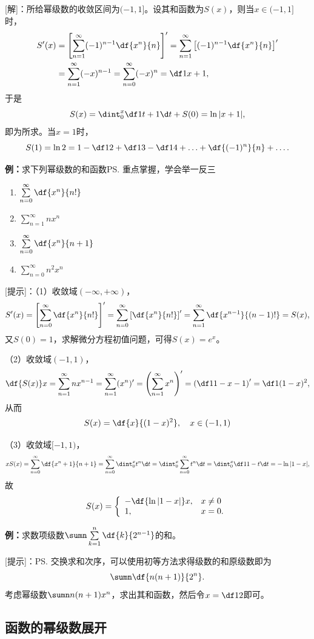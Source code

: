 [解]：所给幂级数的收敛区间为$(-1,1]$。设其和函数为$S(x)$，则当$x\in(-1,1]$时，
\begin{align*}
	S'(x)&=\left[\sum\limits_{n=1}^{\infty}(-1)^{n-1}\df{x^n}{n}\right]'
	=\sum\limits_{n=1}^{\infty}\left[(-1)^{n-1}\df{x^n}{n}\right]'\\
	&=\sum\limits_{n=1}^{\infty}(-x)^{n-1}
	=\sum\limits_{n=0}^{\infty}(-x)^{n}=\df1{x+1},
\end{align*}
于是
$$S(x)=\dint_0^x\df1{t+1}\d t+S(0)=\ln|x+1|,$$
即为所求。当$x=1$时，
$$S(1)=\ln 2=1-\df 12+\df 13-\df 14+\ldots+\df{(-1)^n}{n}+\ldots.$$

{\bf 例：}求下列幂级数的和函数\ps{重点掌握，学会举一反三}
\begin{enumerate}[(1)]
  \setlength{\itemindent}{1cm}
  \item $\sum\limits_{n=0}^{\infty}\df{x^n}{n!}$
  \item $\sum\limits_{n=1}^{\infty}nx^n$
  \item $\sum\limits_{n=0}^{\infty}\df{x^n}{n+1}$
  \item $\sum\limits_{n=0}^{\infty}n^2x^n$
\end{enumerate}

[提示]：（1）收敛域$(-\infty,+\infty)$，
$$S'(x)=\left[\sum\limits_{n=0}^{\infty}\df{x^n}{n!}\right]'
=\sum\limits_{n=0}^{\infty}\left[\df{x^n}{n!}\right]'
=\sum\limits_{n=1}^{\infty}\df{x^{n-1}}{(n-1)!}=S(x),$$
又$S(0)=1$，求解微分方程初值问题，可得$S(x)=e^x$。

（2）收敛域$(-1,1)$，
$$
	\df{S(x)}x=\sum\limits_{n=1}^{\infty}nx^{n-1}
	=\sum\limits_{n=1}^{\infty}(x^{n})'
	=\left(\sum\limits_{n=1}^{\infty}x^{n}\right)'
	=\left(\df1{1-x}-1\right)'=\df1{(1-x)^2},
$$
从而
$$S(x)=\df{x}{(1-x)^2},\quad x\in(-1,1)$$

（3）收敛域$[-1,1)$，
$$
xS(x)=\sum\limits_{n=0}^{\infty}\df{x^n+1}{n+1}
=\sum\limits_{n=0}^{\infty}\dint_0^x t^n\d t
=\dint_0^x \sum\limits_{n=0}^{\infty}t^n\d t
=\dint_0^x \df1{1-t}\d t=-\ln|1-x|,
$$
故
$$S(x)=\left\{\begin{array}{ll}
	-\df{\ln|1-x|}x,&x\ne0\\
	1,&x=0.
\end{array}\right.$$

{\bf 例：}求数项级数$\sumn\sum\limits_{k=1}^n\df{k}{2^{n-1}}$的和。

[提示]：\ps{交换求和次序，可以使用初等方法求得级数的和}原级数即为
$$\sumn\df{n(n+1)}{2^n}.$$
考虑幂级数$\sumn n(n+1)x^n$，求出其和函数，然后令$x=\df12$即可。

\subsection{函数的幂级数展开}

